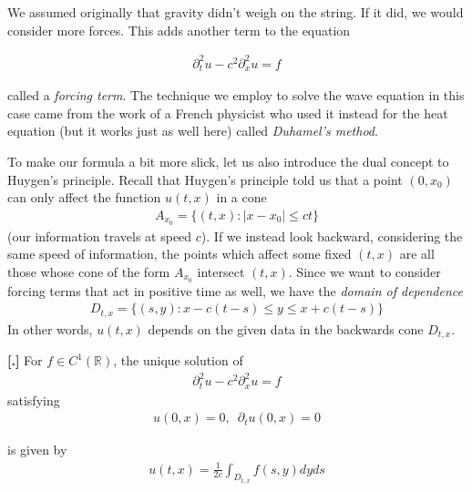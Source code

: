\documentclass{article}
\newcommand{\R}{{\mathbb{R}}}
\newcommand{\pd}{\partial}
\newcounter{result}[section]
\newenvironment{res}[1][]{\refstepcounter{result}\par\medskip
	\noindent \textbf{[\thesection.\theresult] #1} \rmfamily}{\medskip}
\begin{document}
	We assumed originally that gravity didn't weigh on the string. If it did, we would consider more forces. This adds another term to the equation
	
	\begin{align*}
		\pd_{t}^{2}u - c^2 \pd_{x}^{2}u = f
	\end{align*}
	
	called a \textit{forcing term}. The technique we employ to solve the wave equation in this case came from the work of a French physicist who used it instead for the heat equation (but it works just as well here) called \textit{Duhamel's method}. 
	
	To make our formula a bit more slick, let us also introduce the dual concept to Huygen's principle. Recall that Huygen's principle told us that a point $(0,x_0)$ can only affect the function $u(t,x)$ in a cone 
	\begin{align*}
		A_{x_0} = \{(t,x): |x-x_0| \leq ct\}
	\end{align*} 
	(our information travels at speed $c$). If we instead look backward, considering the same speed of information, the points which affect some fixed $(t,x)$ are all those whose cone of the form $A_{x_0}$ intersect $(t,x)$. Since we want to consider forcing terms that act in positive time as well, we have the \textit{domain of dependence}
	\begin{align*}
		D_{t,x} = \{(s,y) : x - c(t-s) \leq y \leq x+c(t-s)\}
	\end{align*}
	In other words, $u(t,x)$ depends on the given data in the backwards cone $D_{t,x}$. 
	
	\begin{res}
		For $f \in C^{1}(\R)$, the unique solution of 
		\begin{align*}
			\pd_{t}^{2}u - c^2 \pd_{x}^{2}u = f
		\end{align*}
		satisfying 
		\begin{align*}
			u(0,x) = 0 , \,\,\, \pd_{t} u (0,x) = 0
		\end{align*}
		
		is given by 
		\begin{align*}
			u(t,x) = \frac{1}{2c} \int_{D_{t,x}} f(s,y) dyds
		\end{align*}
	\end{res}
	
\end{document}
